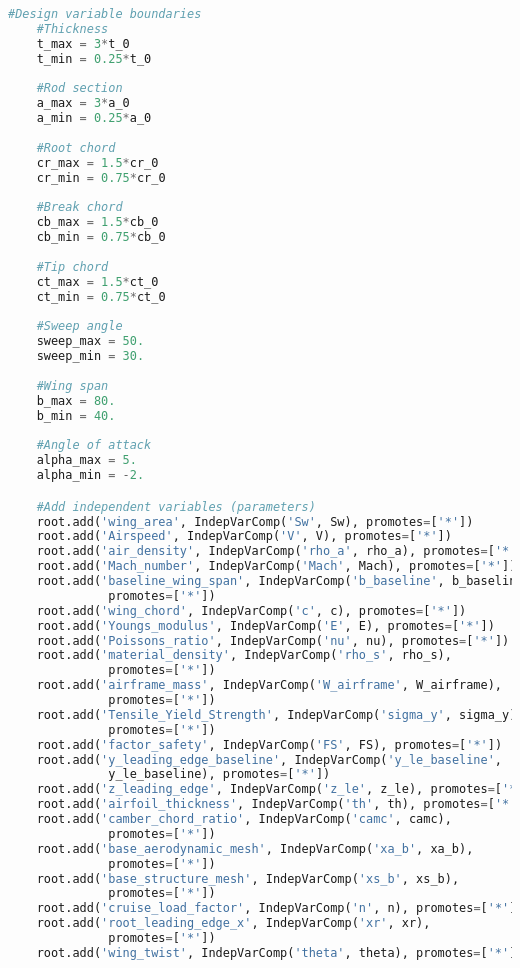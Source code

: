 \begin{lstlisting}[language=Python]
    #Design variable boundaries
    #Thickness
    t_max = 3*t_0
    t_min = 0.25*t_0
    
    #Rod section
    a_max = 3*a_0
    a_min = 0.25*a_0
    
    #Root chord 
    cr_max = 1.5*cr_0
    cr_min = 0.75*cr_0
    
    #Break chord
    cb_max = 1.5*cb_0
    cb_min = 0.75*cb_0
    
    #Tip chord
    ct_max = 1.5*ct_0
    ct_min = 0.75*ct_0
    
    #Sweep angle
    sweep_max = 50.
    sweep_min = 30.
    
    #Wing span 
    b_max = 80.
    b_min = 40.
    
    #Angle of attack
    alpha_max = 5.
    alpha_min = -2.

    #Add independent variables (parameters)
    root.add('wing_area', IndepVarComp('Sw', Sw), promotes=['*'])
    root.add('Airspeed', IndepVarComp('V', V), promotes=['*'])
    root.add('air_density', IndepVarComp('rho_a', rho_a), promotes=['*'])
    root.add('Mach_number', IndepVarComp('Mach', Mach), promotes=['*'])
    root.add('baseline_wing_span', IndepVarComp('b_baseline', b_baseline), 
              promotes=['*'])
    root.add('wing_chord', IndepVarComp('c', c), promotes=['*'])
    root.add('Youngs_modulus', IndepVarComp('E', E), promotes=['*'])
    root.add('Poissons_ratio', IndepVarComp('nu', nu), promotes=['*'])
    root.add('material_density', IndepVarComp('rho_s', rho_s), 
              promotes=['*'])
    root.add('airframe_mass', IndepVarComp('W_airframe', W_airframe), 
              promotes=['*'])
    root.add('Tensile_Yield_Strength', IndepVarComp('sigma_y', sigma_y), 
              promotes=['*'])
    root.add('factor_safety', IndepVarComp('FS', FS), promotes=['*'])
    root.add('y_leading_edge_baseline', IndepVarComp('y_le_baseline', 
              y_le_baseline), promotes=['*'])
    root.add('z_leading_edge', IndepVarComp('z_le', z_le), promotes=['*'])
    root.add('airfoil_thickness', IndepVarComp('th', th), promotes=['*'])
    root.add('camber_chord_ratio', IndepVarComp('camc', camc), 
              promotes=['*'])
    root.add('base_aerodynamic_mesh', IndepVarComp('xa_b', xa_b), 
              promotes=['*'])
    root.add('base_structure_mesh', IndepVarComp('xs_b', xs_b), 
              promotes=['*'])
    root.add('cruise_load_factor', IndepVarComp('n', n), promotes=['*'])
    root.add('root_leading_edge_x', IndepVarComp('xr', xr), 
              promotes=['*'])
    root.add('wing_twist', IndepVarComp('theta', theta), promotes=['*'])


\end{lstlisting}
